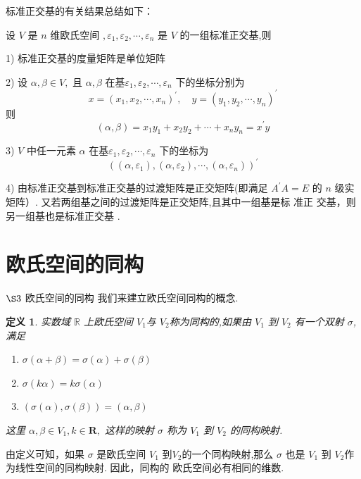 \documentclass[13pt]{beamer}
\newtheorem*{defi}{定义}
\begin{document}
\begin{frame}
标准正交基的有关结果总结如下：

设 $V$ 是 $n$ 维欧氏空间 $, \varepsilon_{1}, \varepsilon_{2}, \cdots, \varepsilon_{n}$ 是 $V$ 的一组标准正交基,则

1) 标准正交基的度量矩阵是单位矩阵

2) 设 $\alpha, \beta \in V,$ 且 $\alpha, \beta$ 在基$\varepsilon_1, \varepsilon_{2}, \cdots, \varepsilon_{n}$ 下的坐标分别为
\[
x=\left(x_{1}, x_{2}, \cdots, x_{n}\right)^{\prime}, \quad y=\left(y_{1}, y_{2}, \cdots, y_{n}\right)^{\prime}
\]
则
\[
(\alpha, \beta)=x_{1} y_{1}+x_{2} y_{2}+\cdots+x_{n} y_{n}=x^{\prime} y
\]

3) $V$ 中任一元素 $\alpha$ 在基$\varepsilon_{1}, \varepsilon_{2}, \cdots, \varepsilon_{n}$ 下的坐标为
\[
\left(\left(\alpha, \varepsilon_{1}\right),\left(\alpha, \varepsilon_{2}\right), \cdots,\left(\alpha, \varepsilon_{n}\right)\right)^{\prime}
\]

4) 由标准正交基到标准正交基的过渡矩阵是正交矩阵(即满足 $A^{\prime} A=E$ 的
$n$ 级实矩阵）. 
又若两组基之间的过渡矩阵是正交矩阵,且其中一组基是标 准正
交基，则另一组基也是标准正交基 .
\end{frame}

\section{欧氏空间的同构}
\begin{frame}{$\S 3$ 欧氏空间的同构}
我们来建立欧氏空间同构的概念.  

\begin{defi}
 实数域 $\mathbb{R}$ 上欧氏空间 $V_1$与 $V_2$称为同构的,如果由 $V_1$ 到 $V_2$ 有一个双射 $\sigma$,满足
\begin{enumerate}
	\item $\sigma({\alpha}+{\beta})=\sigma({\alpha})+\sigma({\beta})$
	\item $\sigma(k {\alpha})=k \sigma({\alpha})$
	\item $(\sigma({\alpha}), \sigma({\beta}))=({\alpha}, {\beta})$
\end{enumerate}
这里 ${\alpha}, {\beta} \in V_1, k \in \mathbf{R},$ 这样的映射 $\sigma$ 称为 $V_1$ 到 $V_2$ 的同构映射. 
\end{defi}
由定义可知，如果 $\sigma$ 是欧氏空间 $V_1$ 到$V_2$的一个同构映射,那么 $\sigma$ 也是 $V_1$ 到 $V_2$作为线性空间的同构映射.
因此，同构的 欧氏空间必有相同的维数.
\end{frame}
\end{document}
